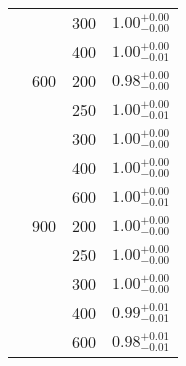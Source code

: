 \begin{table}
\begin{tabular}{cccc}
 &  & 300 & $1.00^{+0.00}_{-0.00}$ \\
 &  & 400 & $1.00^{+0.00}_{-0.01}$ \\
\hline
 & 600 & 200 & $0.98^{+0.00}_{-0.00}$ \\
 &  & 250 & $1.00^{+0.00}_{-0.01}$ \\
 &  & 300 & $1.00^{+0.00}_{-0.00}$ \\
 &  & 400 & $1.00^{+0.00}_{-0.00}$ \\
 &  & 600 & $1.00^{+0.00}_{-0.01}$ \\
\hline
 & 900 & 200 & $1.00^{+0.00}_{-0.00}$ \\
 &  & 250 & $1.00^{+0.00}_{-0.00}$ \\
 &  & 300 & $1.00^{+0.00}_{-0.00}$ \\
 &  & 400 & $0.99^{+0.01}_{-0.01}$ \\
 &  & 600 & $0.98^{+0.01}_{-0.01}$ \\

\hline
\hline
\end{tabular}
\end{table}

